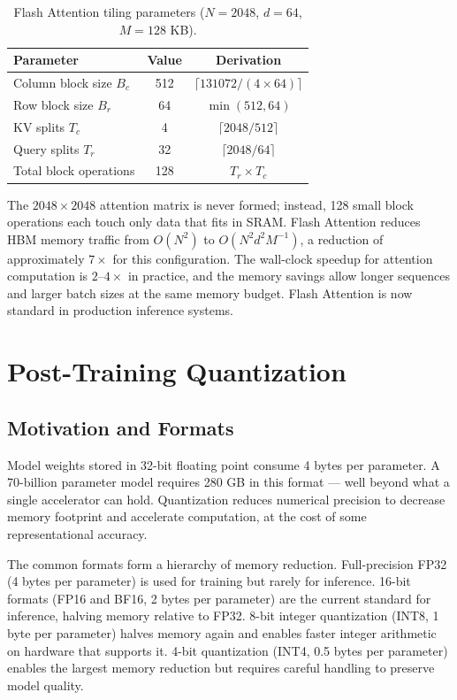\documentclass{book}
\begin{document}
\begin{table}[htbp]
\centering
\caption{Flash Attention tiling parameters ($N=2048$, $d=64$, $M=128$ KB).}
\label{tab:flash_tiling}
\renewcommand{\arraystretch}{1.2}
\begin{tabular}{lcc}
\hline
\textbf{Parameter} & \textbf{Value} & \textbf{Derivation} \\
\hline
Column block size $B_c$ & 512 & $\lceil 131072 / (4 \times 64) \rceil$ \\
Row block size $B_r$ & 64 & $\min(512, 64)$ \\
KV splits $T_c$ & 4 & $\lceil 2048 / 512 \rceil$ \\
Query splits $T_r$ & 32 & $\lceil 2048 / 64 \rceil$ \\
Total block operations & 128 & $T_r \times T_c$ \\
\hline
\end{tabular}
\end{table}

The $2048 \times 2048$ attention matrix is never formed; instead, 128
small block operations each touch only data that fits in SRAM. Flash
Attention reduces HBM memory traffic from $O(N^2)$ to
$O(N^2 d^2 M^{-1})$, a reduction of approximately $7\times$ for this
configuration. The wall-clock speedup for attention computation is
$2$--$4\times$ in practice, and the memory savings allow longer sequences
and larger batch sizes at the same memory budget. Flash Attention is
now standard in production inference systems.

\section{Post-Training Quantization}
\label{sec:quantization}

\subsection{Motivation and Formats}
\label{sec:quant_motivation}

Model weights stored in 32-bit floating point consume 4 bytes per parameter.
A 70-billion parameter model requires 280 GB in this format --- well beyond
what a single accelerator can hold. Quantization reduces numerical precision
to decrease memory footprint and accelerate computation, at the cost of
some representational accuracy.

The common formats form a hierarchy of memory reduction. Full-precision
FP32 (4 bytes per parameter) is used for training but rarely for inference.
16-bit formats (FP16 and BF16, 2 bytes per parameter) are the current
standard for inference, halving memory relative to FP32. 8-bit integer
quantization (INT8, 1 byte per parameter) halves memory again and enables
faster integer arithmetic on hardware that supports it. 4-bit quantization
(INT4, 0.5 bytes per parameter) enables the largest memory reduction but
requires careful handling to preserve model quality.
\end{document}
